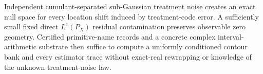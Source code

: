 Independent cumulant-separated sub-Gaussian treatment noise creates an exact null space for every location shift induced by treatment-code error.  A sufficiently small fixed direct \(L^1(P_X)\) residual contamination preserves observable zero geometry.  Certified primitive-name records and a concrete complex interval-arithmetic substrate then suffice to compute a uniformly conditioned contour bank and every estimator trace without exact-real rewrapping or knowledge of the unknown treatment-noise law.